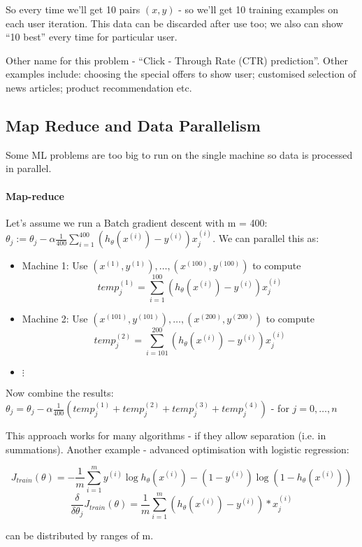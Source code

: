 \documentclass{scrartcl}
\begin{document}
So every time we'll get 10 pairs $(x, y)$ - so we'll get 10 training
examples on each user iteration. This data can be discarded after use
too; we also can show ``10 best'' every time for particular user.

Other name for this problem - ``Click - Through Rate (CTR)
prediction''. Other examples include: choosing the special offers to
show user; customised selection of news articles; product
recommendation etc.

\subsection{Map Reduce and Data Parallelism}
\label{sec:17-6}

Some ML problems are too big to run on the single machine so data is
processed in parallel.

\paragraph{Map-reduce}

Let's assume we run a Batch gradient descent with m = 400: $\theta_j
:= \theta_j - \alpha \frac{1}{400} \sum_{i=1}^{400} (h_\theta(x^{(i)})
- y^{(i)}) x_j^{(i)}$. We can parallel this as:
\begin{itemize}
\item Machine 1: Use $(x^{(1)}, y^{(1)}), \dots, (x^{(100)},
  y^{(100)})$ to compute \[temp_j^{(1)} = \sum_{i=1}^{100}
  (h_\theta(x^{(i)}) - y^{(i)})x_j^{(i)}\]
\item Machine 2: Use $(x^{(101)}, y^{(101)}), \dots, (x^{(200)},
  y^{(200)})$ to compute \[temp_j^{(2)} = \sum_{i=101}^{200}
  (h_\theta(x^{(i)}) - y^{(i)})x_j^{(i)}\]
\item $\vdots$
\end{itemize}
Now combine the results: $\theta_j = \theta_j - \alpha
\frac{1}{400}(temp_j^{(1)} + temp_j^{(2)} + temp_j^{(3)} +
temp_j^{(4)})$ - for $j = 0,\dots, n$

This approach works for many algorithms - if they allow separation
(i.e. in summations). Another example - advanced optimisation with
logistic regression:

\[ J_{train}(\theta) = -\frac{1}{m} \sum \limits_{i=1}^m y^{(i)} \log
h_\theta(x^{(i)}) - (1 - y^{(i)}) \log (1-h_\theta(x^{(i)})) \]
\[\frac{\delta}{\delta \theta_j} J_{train}(\theta) = \frac{1}{m}
\sum_{i=1}^m (h_\theta(x^{(i)}) - y^{(i)}) * x_j^{(i)} \]

can be distributed by ranges of m.
\end{document}
